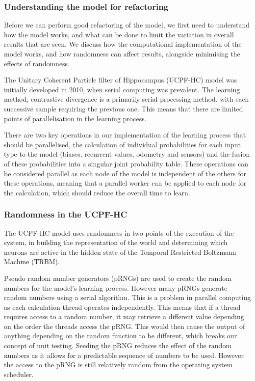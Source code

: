 \subsubsection{Understanding the model for refactoring}


Before we can perform good refactoring of the model, we first need to understand how the model works, and what can be done to limit the variation in overall results that are seen.
We discuss how the computational implementation of the model works, and how randomness can affect results, alongside minimising the effects of randomness. 

The Unitary Coherent Particle filter of Hippocampus (UCPF-HC) model was initially developed in 2010, when serial computing was prevalent.
The learning method, contrastive divergence \citep{hintonDBN2006} is a primarily serial processing method, with each successive sample requiring the previous one.
This means that there are limited points of parallelisation in the learning process.

There are two key operations in our implementation of the learning process that should be parallelised, the calculation of individual probabilities for each input type to the model (biases, recurrent values, odometry and sensors) and the fusion of these probabilities into a singular joint probability table.
These operations can be considered parallel as each node of the model is independent of the others for these operations, meaning that a parallel worker can be applied to each node for the calculation, which should reduce the overall time to learn.


\subsubsection{Randomness in the UCPF-HC}
The UCPF-HC model uses randomness in two points of the execution of the system, in building the representation of the world and determining which neurons are active in the hidden state of the Temporal Restricted Boltzmann Machine (TRBM).

Pseudo random number generators (pRNGs) are used to create the random numbers for the model's learning process.
However many pRNGs generate random numbers using a serial algorithm.
This is a problem in parallel computing as each calculation thread operates independently.
This means that if a thread requires access to a random number, it may retrieve a different value depending on the order the threads access the pRNG.
This would then cause the output of anything depending on the random function to be different, which breaks our concept of unit testing.
Seeding the pRNG reduces the effect of the random numbers as it allows for a predictable sequence of numbers to be used.
However the access to the pRNG is still relatively random from the operating system scheduler.

